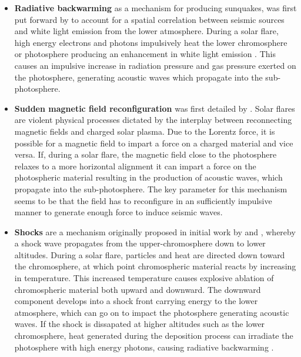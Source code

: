 \begin{itemize}
\item \textbf{Radiative backwarming} as a mechanism for producing sunquakes, was first put forward by \cite{2005ApJ...630.1168D} to account for a spatial correlation between seismic sources and white light emission from the lower atmosphere. During a solar flare, high energy electrons and photons impulsively heat the lower chromosphere or photosphere producing an enhancement in white light emission \citep{1989SoPh..124..303M}. This causes an impulsive increase in radiation pressure and gas pressure exerted on the photosphere, generating acoustic waves which propagate into the sub-photosphere. \\
     
\item \textbf{Sudden magnetic field reconfiguration} was first detailed by \cite{2008ASPC..383..221H}. Solar flares are violent physical processes dictated by the interplay between reconnecting magnetic fields and charged solar plasma. Due to the Lorentz force, it is possible for a magnetic field to impart a force on a charged material and vice versa. If, during a solar flare, the magnetic field close to the photosphere relaxes to a more horizontal alignment it can impart a force on the photospheric material resulting in the production of acoustic waves, which propagate into the sub-photosphere. The key parameter for this mechanism seems to be that the field has to reconfigure in an sufficiently impulsive manner to generate enough force to induce seismic waves. \\

\item \textbf{Shocks} are a mechanism originally proposed in initial work by \cite{1995ESASP.376b.341K} and \cite{1998Natur.393..317K}, whereby a shock wave propagates from the upper-chromosphere down to lower altitudes. During a solar flare, particles and heat are directed down toward the chromosphere, at which point chromospheric material reacts by increasing in temperature. This increased temperature causes explosive ablation of chromospheric material both upward and downward. The downward component develops into a shock front carrying energy to the lower atmosphere, which can go on to impact the photosphere generating acoustic waves. If the shock is dissapated at higher altitudes such as the lower chromosphere, heat generated during the deposition process can irradiate the photosphere with high energy photons, causing radiative backwarming \citep{1989SoPh..124..303M}. \\


\end{itemize}
